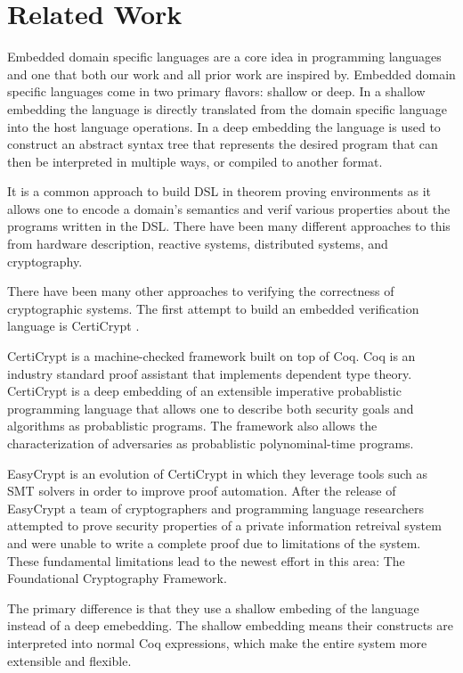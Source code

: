 \section{Related Work} \label{relatedwork}
Embedded domain specific languages are a core idea in programming languages and
one that both our work and all prior work are inspired by. Embedded domain specific
languages come in two primary flavors: shallow or deep. In a shallow embedding the
language is directly translated from the domain specific language into the host language
operations. In a deep embedding the language is used to construct an abstract
syntax tree that represents the desired program that can then be interpreted in
multiple ways, or compiled to another format.

It is a common approach to build DSL in theorem proving environments as it allows
one to encode a domain's semantics and verif various properties about the programs
written in the DSL. There have been many different approaches to this from
hardware description\cite{PicoCoq2013:POPL}\cite{fesi},
reactive systems\cite{Ricketts:2014}, distributed systems,
and cryptography.

There have been many other approaches to verifying the correctness of cryptographic
systems. The first attempt to build an embedded verification language is
CertiCrypt \cite{Barthe:2012:POST}\cite{Zanella:2012:POPL}\cite{Barthe:2009:POPL}\cite{Barthe:2013:JCS}.

CertiCrypt is a machine-checked framework built on top of Coq. Coq is
an industry standard proof assistant that implements dependent type theory.
CertiCrypt is a deep embedding of an extensible imperative probablistic
programming language that allows one to describe both security goals
and algorithms as probablistic programs. The framework also allows the
characterization of adversaries as probablistic polynominal-time programs.

EasyCrypt is an evolution of CertiCrypt in which they leverage tools such as
SMT solvers in order to improve proof automation. After the release of EasyCrypt
a team of cryptographers and programming language researchers attempted to prove
security properties of a private information retreival system and were unable
to write a complete proof due to limitations of the system. These fundamental
limitations lead to the newest effort in this area: The Foundational Cryptography
Framework\cite{DBLP:journals/corr/PetcherM14}.

The primary difference is that they use a shallow embeding of the language
instead of a deep emebedding. The shallow embedding means their constructs
are interpreted into normal Coq expressions, which make the entire system more
extensible and flexible.

